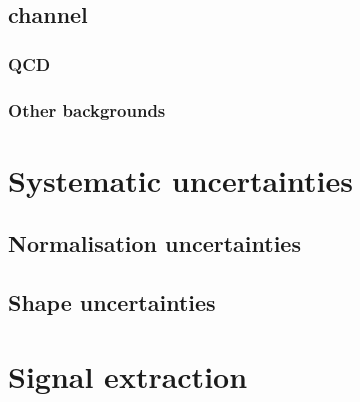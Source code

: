 \subsection{\texorpdfstring{\emu channel}{emu channel}}
\label{sec:mssm_bkgs_em}

\subsubsection{\texorpdfstring{\Ztautau}{Z to tau tau}}
\label{sec:mssm_bkgs_em_ztt}

\subsubsection{QCD}
\label{sec:mssm_bkgs_em_qcd}

\subsubsection{\texorpdfstring{\Wjets}{W+jets}}
\label{sec:mssm_bkgs_em_wjets}

\subsubsection{\texorpdfstring{\ttbar}{ttbar}}
\label{sec:mssm_bkgs_em_tt}

\subsubsection{Other backgrounds}
\label{sec:mssm_bkgs_em_other}


\section{Systematic uncertainties}
\label{sec:mssm_uncs}

\subsection{Normalisation uncertainties}
\label{sec:mssm_uncs_norm}

\subsection{Shape uncertainties}
\label{sec:mssm_uncs_shape}

\section{Signal extraction}
\label{sec:mssm_signalextraction}

